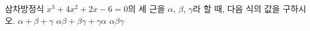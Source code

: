 삼차방정식 $x^3+4x^2+2x-6=0$의 세 근을 $\alpha$, $\beta$, $\gamma$라 할 때, 다음 식의 값을 구하시오.
 $\alpha+\beta+\gamma$
 $\alpha\beta+\beta\gamma+\gamma\alpha$
 $\alpha\beta\gamma$
